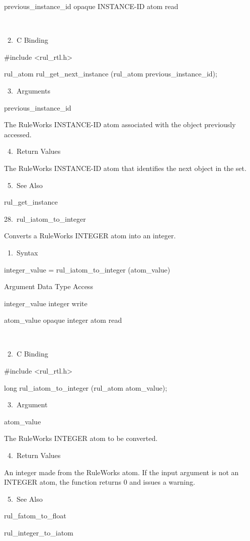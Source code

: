 {          previous_instance_id  opaque
          INSTANCE-ID atom  read

           

       2. C Binding

          #include <rul_rtl.h>

          rul_atom rul_get_next_instance
          (rul_atom previous_instance_id);

       3. Arguments

          previous_instance_id

          The RuleWorks INSTANCE-ID atom
          associated with the object
          previously accessed.

       4. Return Values

          The RuleWorks INSTANCE-ID atom that
          identifies the next object in the
          set.

       5. See Also

    rul_get_instance

28. rul_iatom_to_integer

    Converts a RuleWorks INTEGER atom into an
    integer.

       1. Syntax

          integer_value = rul_iatom_to_integer
          (atom_value)

          Argument  Data Type    Access

          integer_value  integer    write

          atom_value  opaque integer atom
           read

           

       2. C Binding

          #include <rul_rtl.h>

          long rul_iatom_to_integer (rul_atom
          atom_value);

       3. Argument

          atom_value

          The RuleWorks INTEGER atom to be
          converted.

       4. Return Values

          An integer made from the RuleWorks
          atom. If the input argument is not
          an INTEGER atom, the function
          returns 0 and issues a warning.

       5. See Also

          rul_fatom_to_float

          rul_integer_to_iatom

}
